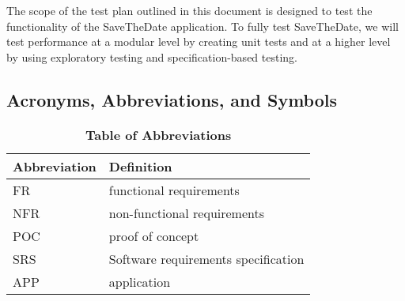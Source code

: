 \documentclass[12pt, titlepage]{article}
\begin{document}
The scope of the test plan outlined in this document is designed to test the functionality of the SaveTheDate application. To fully test SaveTheDate, we will test performance at a modular level by creating unit tests and at a higher level by using exploratory testing and specification-based testing. 

\subsection{Acronyms, Abbreviations, and Symbols}
	
\begin{table}[hbp]
\caption{\textbf{Table of Abbreviations}} \label{Table}

\begin{tabularx}{\textwidth}{p{3cm}X}
\toprule
\textbf{Abbreviation} & \textbf{Definition} \\
\midrule
FR & functional requirements\\
NFR & non-functional requirements\\
POC & proof of concept\\
SRS & Software requirements specification\\
APP & application\\
\bottomrule
\end{tabularx}

\end{table}
\end{document}
